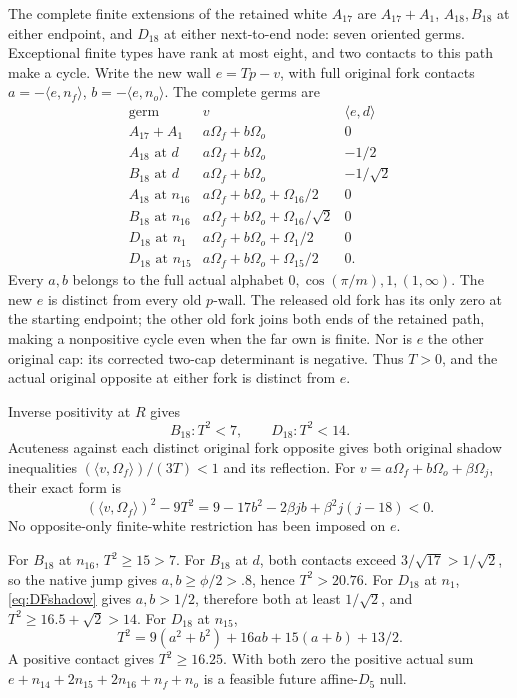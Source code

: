 \documentclass[11pt]{article}
\theoremstyle{definition}
\theoremstyle{remark}
\newcommand{\ip}[2]{\langle #1,#2\rangle}
\begin{document}
The complete finite extensions of the retained white \(A_{17}\)
are \(A_{17}+A_1\), \(A_{18},B_{18}\) at either endpoint,
and \(D_{18}\) at either next-to-end node: seven oriented germs.
Exceptional finite types have rank at most eight, and two contacts
to this path make a cycle.
Write the new wall \(e=Tp-v\), with full original fork contacts
\(a=-\ip e{n_f}\), \(b=-\ip e{n_o}\).
The complete germs are
\[
\begin{array}{c|c|c}
\text{germ}&v&\ip ed\\ \hline
A_{17}+A_1&a\Omega_f+b\Omega_o&0\\
A_{18}\text{ at }d&a\Omega_f+b\Omega_o&-1/2\\
B_{18}\text{ at }d&a\Omega_f+b\Omega_o&-1/\sqrt2\\
A_{18}\text{ at }n_{16}&a\Omega_f+b\Omega_o+\Omega_{16}/2&0\\
B_{18}\text{ at }n_{16}&a\Omega_f+b\Omega_o+\Omega_{16}/\sqrt2&0\\
D_{18}\text{ at }n_1&a\Omega_f+b\Omega_o+\Omega_1/2&0\\
D_{18}\text{ at }n_{15}&a\Omega_f+b\Omega_o+\Omega_{15}/2&0 .
\end{array}
\]
Every \(a,b\) belongs to the full actual alphabet
\(0,\cos(\pi/m),1,(1,\infty)\).
The new \(e\) is distinct from every old \(p\)-wall.
The released old fork has its only zero at the starting endpoint;
the other old fork joins both ends of the retained path,
making a nonpositive cycle even when the far own is finite.
Nor is \(e\) the other original cap: its corrected two-cap
determinant is negative.
Thus \(T>0\), and the actual original opposite at either fork is
distinct from \(e\).

Inverse positivity at \(R\) gives
\[
 B_{18}: T^2<7,\qquad D_{18}:T^2<14.
\]
Acuteness against each distinct original fork opposite gives both
original shadow inequalities
\((\ip v{\Omega_f})/(3T)<1\) and its reflection.
For \(v=a\Omega_f+b\Omega_o+\beta\Omega_j\), their exact form is
\[
 (\ip v{\Omega_f})^2-9T^2
   =9-17b^2-2\beta jb+\beta^2j(j-18)<0 .
\tag{DFshadow}\label{eq:DFshadow}
\]
No opposite-only finite-white restriction has been imposed on \(e\).

For \(B_{18}\) at \(n_{16}\), \(T^2\ge15>7\).
For \(B_{18}\) at \(d\), both contacts exceed
\(3/\sqrt{17}>1/\sqrt2\), so the native jump gives
\(a,b\ge\phi/2>.8\), hence \(T^2>20.76\).
For \(D_{18}\) at \(n_1\),
\eqref{eq:DFshadow} gives \(a,b>1/2\), therefore both at least
\(1/\sqrt2\), and \(T^2\ge16.5+\sqrt2>14\).
For \(D_{18}\) at \(n_{15}\),
\[
 T^2=9(a^2+b^2)+16ab+15(a+b)+13/2 .
\]
A positive contact gives \(T^2\ge16.25\).
With both zero the positive actual sum
\(e+n_{14}+2n_{15}+2n_{16}+n_f+n_o\)
is a feasible future affine-\(D_5\) null.
\end{document}
